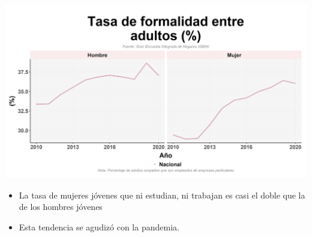 \documentclass[aspectratio=169]{beamer}
\begin{document}
    \begin{slide}{14} 
                      \begin{imagecolumn}
                \includegraphics[width=\columnwidth]{img/var_81_trend.png}
            \end{imagecolumn}
            \begin{textcolumn}
                \begin{itemize}
                    \item La tasa de mujeres jóvenes que ni estudian, ni trabajan es casi el doble que la de los hombres jóvenes
                    \item Esta tendencia se agudizó con la pandemia.
                \end{itemize}
            \end{textcolumn}

    \printcolumns
    \end{slide}
    
\end{document}

